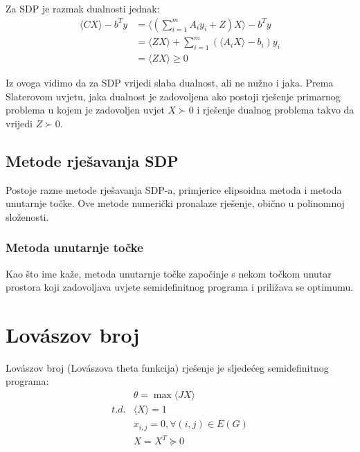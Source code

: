 \documentclass[diplomskirad]{fer}
\begin{document}
Za SDP je razmak dualnosti jednak:
\begin{equation}
  \begin{split}
    \langle CX \rangle - b^Ty &= \langle(\sum_{i=1}^{m}A_iy_i + Z)X \rangle - b^Ty \\
    &= \langle ZX \rangle + \sum_{i=1}^{m}(\langle A_iX \rangle - b_i) y_i \\
    &= \langle ZX \rangle \geq 0
  \end{split}
\end{equation}

Iz ovoga vidimo da za SDP vrijedi slaba dualnost, ali ne nužno i jaka. Prema Slaterovom uvjetu, jaka dualnost je zadovoljena ako postoji rješenje primarnog problema u kojem je
zadovoljen uvjet $X \succ 0$ i rješenje dualnog problema takvo da vrijedi $Z \succ 0$. %

\section{Metode rješavanja SDP}
Postoje razne metode rješavanja SDP-a, primjerice elipsoidna metoda i metoda unutarnje točke. Ove metode numerički pronalaze rješenje, obično u polinomnoj složenosti.

\subsection{Metoda unutarnje točke}
Kao što ime kaže, metoda unutarnje točke započinje s nekom točkom unutar prostora koji zadovoljava uvjete semidefinitnog programa i priližava se optimumu. 

\chapter{Lovászov broj}
\label{pog:lovaszov_broj}
Lovászov broj (Lovászova theta funkcija) rješenje je sljedećeg semidefinitnog programa:
\begin{equation}
  \begin{split}
    & \theta = \max \langle JX \rangle \\
    t.d. & \langle X \rangle = 1 \\
         & x_{i,j} = 0, \forall (i,j) \in E(G) \\
         & X=X^T \succeq 0 
  \end{split}
\end{equation}
\end{document}

